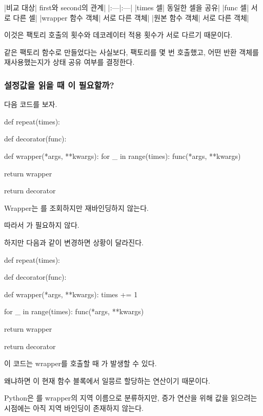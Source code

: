 \begin{dhktable}
|비교 대상|	first와 second의 관계|
|:---|:---|
|times 셀|	동일한 셀을 공유|
|func 셀|	서로 다른 셀|
|wrapper 함수 객체|	서로 다른 객체|
|원본 함수 객체|	서로 다른 객체|
\end{dhktable}

이것은 팩토리 호출의 횟수와 데코레이터 적용 횟수가 서로 다르기 때문이다.

같은 팩토리 함수로 만들었다는 사실보다, 팩토리를 몇 번 호출했고, 어떤 반환 객체를 재사용했는지가 상태 공유 여부를 결정한다.

\subsubsection{설정값을 읽을 때 이 필요할까?}

다음 코드를 보자.

\begin{dhkcode}
def repeat(times):

    def decorator(func):

        def wrapper(*args, **kwargs):
            for _ in range(times):
                func(*args, **kwargs)

        return wrapper

    return decorator
\end{dhkcode}

Wrapper는 를 조회하지만 재바인딩하지 않는다.

따라서 가 필요하지 않다.

하지만 다음과 같이 변경하면 상황이 달라진다.

\begin{dhkcode}
def repeat(times):

    def decorator(func):

        def wrapper(*args, **kwargs):
            times += 1

            for _ in range(times):
                func(*args, **kwargs)

        return wrapper

    return decorator
\end{dhkcode}

이 코드는 wrapper를 호출할 때 가 발생할 수 있다.

왜냐하면 이 현재 함수 블록에서 일믕르 할당하는 연산이기 때문이다.

Python은 를 wrapper의 지역 이름으로 분류하지만, 증가 연산을 위해 값을 읽으려는 시점에는 아직 지역 바인딩이 존재하지 않는다.

